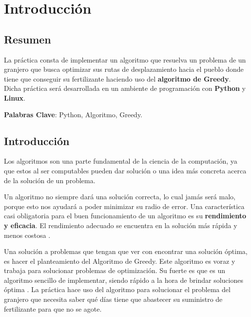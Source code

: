 
\chapter{Introducción}



\section{Resumen}
    La práctica consta de implementar un algoritmo que resuelva un problema de un granjero que busca optimizar sus rutas de desplazamiento hacia el pueblo donde tiene que conseguir su fertilizante haciendo uso del \textbf{algoritmo de Greedy}. Dicha práctica será desarrollada en un ambiente de programación con \textbf{Python} y \textbf{Linux}. 
    
    \textbf{Palabras Clave}: Python, Algoritmo, Greedy.

\section{Introducción}

    Los algoritmos son una parte fundamental de la ciencia de la computación, ya que estos al ser computables pueden dar solución o una idea más concreta acerca de la solución de un problema.
    
    Un algoritmo no siempre dará una solución correcta, lo cual jamás será malo, porque esto nos ayudará a poder minimizar su radio de error. Una característica casi obligatoria para el buen funcionamiento de un algoritmo es su \textbf{rendimiento y eficacia}. El rendimiento adecuado se encuentra en la solución más rápida y menos costosa \cite{Algorithm}.

    Una solución a problemas que tengan que ver con encontrar una solución óptima, es hacer el planteamiento del Algoritmo de Greedy. Este algoritmo es voraz y trabaja para solucionar problemas de optimización. Su fuerte es que es un algoritmo sencillo de implementar, siendo rápido a la hora de brindar soluciones óptima \cite{Greedy}. La práctica hace uso del algoritmo para solucionar el problema del granjero que necesita saber qué días tiene que abastecer su suministro de fertilizante para que no se agote. 



    
